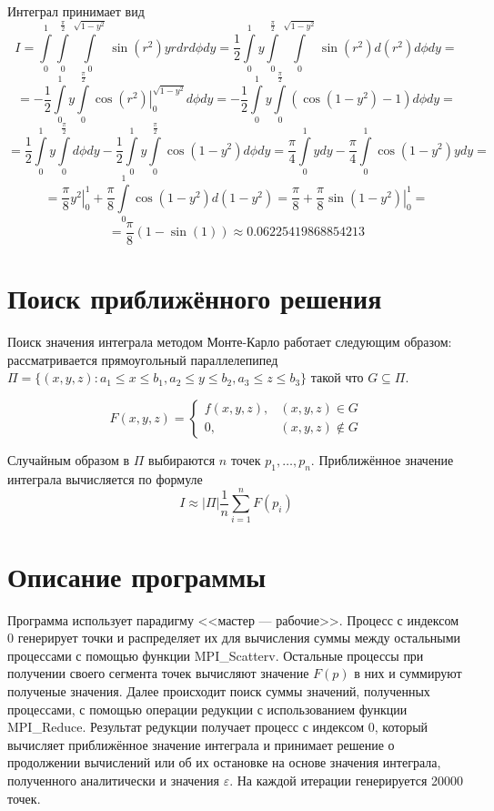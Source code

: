 \documentclass[12pt]{article}
\begin{document}
Интеграл принимает вид
$$
I = \int\limits_0^1 \int\limits_0^{\frac{\pi}{2}} \int\limits_0^{\sqrt{1 - y^2}}
\sin(r^2) y r dr d\phi dy =
\frac{1}{2}
\int\limits_0^1 y \int\limits_0^{\frac{\pi}{2}} \int\limits_0^{\sqrt{1 - y^2}}
\sin(r^2) d(r^2) d\phi dy =
$$
$$
= - \frac{1}{2}
\int\limits_0^1 y \int\limits_0^{\frac{\pi}{2}}
\left. \cos(r^2) \right|_0^{\sqrt{1 - y^2}} d\phi dy =
- \frac{1}{2}
\int\limits_0^1 y \int\limits_0^{\frac{\pi}{2}}
(\cos(1 - y^2) - 1) d\phi dy =
$$
$$
= \frac{1}{2}
\int\limits_0^1 y \int\limits_0^{\frac{\pi}{2}} d\phi dy -
\frac{1}{2}
\int\limits_0^1 y \int\limits_0^{\frac{\pi}{2}}
\cos(1 - y^2) d\phi dy =
\frac{\pi}{4}
\int\limits_0^1 y dy -
\frac{\pi}{4}
\int\limits_0^1 \cos(1 - y^2) y dy =
$$
$$
= \frac{\pi}{8} \left. y^2 \right|_0^1 +
\frac{\pi}{8}
\int\limits_0^1 \cos(1 - y^2) d(1 - y^2) =
\frac{\pi}{8} +
\frac{\pi}{8} \left. \sin(1 - y^2) \right|_0^1 =
$$
$$
= \frac{\pi}{8} (1 - \sin(1)) \approx 0.06225419868854213
$$

\section{Поиск приближённого решения}

Поиск значения интеграла методом Монте-Карло работает следующим образом:
рассматривается прямоугольный параллелепипед
$\Pi = \{(x, y, z) :
a_1 \leqslant x \leqslant b_1,
a_2 \leqslant y \leqslant b_2,
a_3 \leqslant z \leqslant b_3\}$ такой что
$G \subseteq \Pi$.

$$
F(x, y, z) = \begin{cases}
	f(x, y, z),& (x, y, z) \in G \\
	0,& (x, y, z) \notin G \end{cases}
$$

Случайным образом в $\Pi$ выбираются $n$ точек $p_1, \ldots, p_n$.
Приближённое значение интеграла вычисляется по формуле
$$
I \approx |\Pi|\frac{1}{n}\sum_{i=1}^n F(p_i)
$$

\section{Описание программы}

Программа использует парадигму <<мастер --- рабочие>>.
Процесс с индексом 0 генерирует точки и распределяет их для вычисления суммы
между остальными процессами с помощью функции MPI\_Scatterv.
Остальные процессы при получении своего сегмента
точек вычисляют значение $F(p)$ в них и суммируют полученые значения.
Далее происходит поиск суммы значений, полученных процессами,
с помощью операции редукции с использованием функции MPI\_Reduce.
Результат редукции получает процесс с индексом 0, который вычисляет
приближённое значение интеграла и принимает решение о продолжении вычислений
или об их остановке на основе значения интеграла, полученного аналитически и
значения $\varepsilon$. На каждой итерации генерируется 20000 точек.
\end{document}
